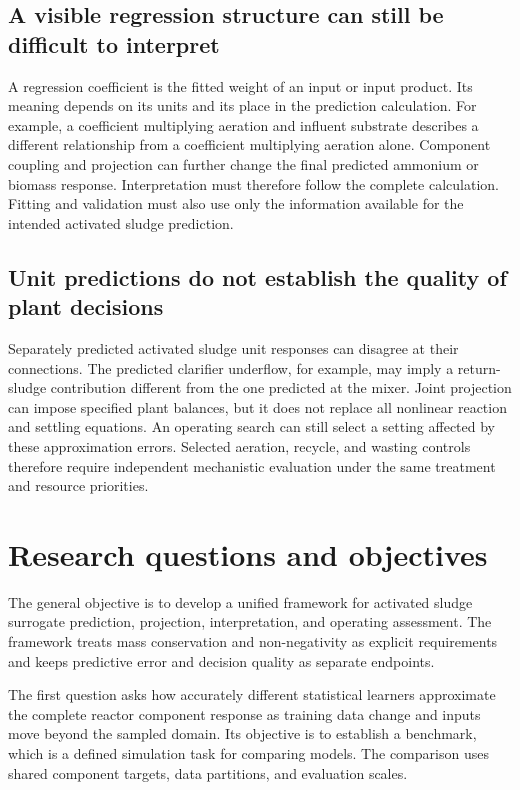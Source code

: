 \subsection{A visible regression structure can still be difficult to interpret}

A regression coefficient is the fitted weight of an input or input product. Its meaning depends on its units and its place in the prediction calculation. For example, a coefficient multiplying aeration and influent substrate describes a different relationship from a coefficient multiplying aeration alone. Component coupling and projection can further change the final predicted ammonium or biomass response. Interpretation must therefore follow the complete calculation. Fitting and validation must also use only the information available for the intended activated sludge prediction.

\subsection{Unit predictions do not establish the quality of plant decisions}

Separately predicted activated sludge unit responses can disagree at their connections. The predicted clarifier underflow, for example, may imply a return-sludge contribution different from the one predicted at the mixer. Joint projection can impose specified plant balances, but it does not replace all nonlinear reaction and settling equations. An operating search can still select a setting affected by these approximation errors. Selected aeration, recycle, and wasting controls therefore require independent mechanistic evaluation under the same treatment and resource priorities.

\section{Research questions and objectives}

The general objective is to develop a unified framework for activated sludge surrogate prediction, projection, interpretation, and operating assessment. The framework treats mass conservation and non-negativity as explicit requirements and keeps predictive error and decision quality as separate endpoints.

The first question asks how accurately different statistical learners approximate the complete reactor component response as training data change and inputs move beyond the sampled domain. Its objective is to establish a benchmark, which is a defined simulation task for comparing models. The comparison uses shared component targets, data partitions, and evaluation scales.

